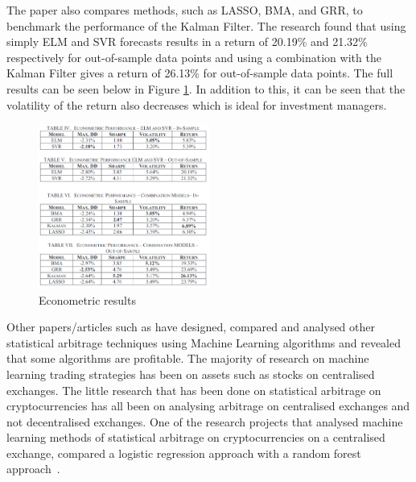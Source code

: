 \noindent The paper also compares methods, such as LASSO, BMA, and GRR, to benchmark the performance of the Kalman Filter. The research found that using simply ELM and SVR forecasts results in a return of 20.19\% and 21.32\% respectively for out-of-sample data points and using a combination with the Kalman Filter gives a return of 26.13\% for out-of-sample data points. The full results can be seen below in Figure \ref{fig:kalman_ml_results}. In addition to this, it can be seen that the volatility of the return also decreases which is ideal for investment managers.
\begin{figure}[htb!]
    \centering
    \includegraphics[width=0.5\textwidth]{background/Images/kalman_ml_results.png}
    \caption{Econometric results~\cite{6974093}}
    \label{fig:kalman_ml_results}
\end{figure}

\noindent Other papers/articles such as \cite{KRAUSS2017689, alma991000475380901591, jrfm12010031} have designed, compared and analysed other statistical arbitrage techniques using Machine Learning algorithms and revealed that some algorithms are profitable. The majority of research on machine learning trading strategies has been on assets such as stocks on centralised exchanges. The little research that has been done on statistical arbitrage on cryptocurrencies has all been on analysing arbitrage on centralised exchanges and not decentralised exchanges. One of the research projects that analysed machine learning methods of statistical arbitrage on cryptocurrencies on a centralised exchange, compared a logistic regression approach with a random forest approach~\cite{jrfm12010031}. 


